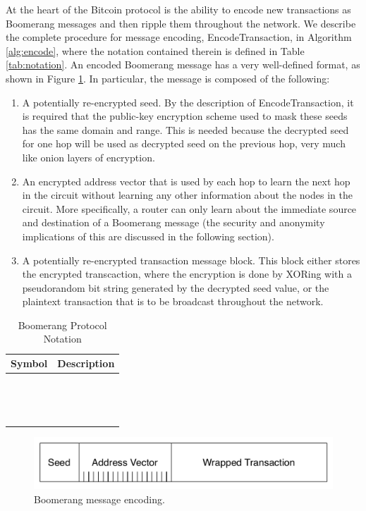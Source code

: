 At the heart of the Bitcoin protocol is the ability to encode new transactions as Boomerang messages and then ripple them throughout the network. We describe the complete procedure for message encoding, {\sf EncodeTransaction}, in Algorithm \ref{alg:encode}, where the notation contained therein is defined in Table \ref{tab:notation}. An encoded Boomerang message has a very well-defined format, as shown in Figure \ref{fig:boomerang_message}. In particular, the message is composed of the following:
\begin{enumerate}
	\item A potentially re-encrypted seed. By the description of {\sf EncodeTransaction}, it is required that the public-key encryption scheme used to mask these seeds has the same domain and range. This is needed because the decrypted seed for one hop will be used as decrypted seed on the previous hop, very much like onion layers of encryption.
	\item An encrypted address vector that is used by each hop to learn the next hop in the circuit without learning any other information about the nodes in the circuit. More specifically, a router can only learn about the immediate source and destination of a Boomerang message (the security and anonymity implications of this are discussed in the following section).
	\item A potentially re-encrypted transaction message block. This block either stores the encrypted transcaction, where the encryption is done by XORing with a pseudorandom bit string generated by the decrypted seed value, or the plaintext transaction that is to be broadcast throughout the network.
\end{enumerate}

\begin{table}[ht!]
\begin{center}
\caption{Boomerang Protocol Notation}
	\begin{tabular}{|l|l|}\hline
	\textbf{Symbol} & \textbf{Description} \\ \hline
	~ & ~ \\
	~ & ~ \\
	~ & ~ \\ \hline
	\end{tabular}
\end{center}
\end{table}

\begin{figure}[ht!]
\begin{center}
\includegraphics[scale=0.4]{./images/boomerang_message.pdf}
\caption{Boomerang message encoding.}
\label{fig:boomerang_message}
\end{center}
\end{figure}

